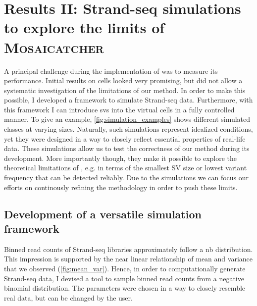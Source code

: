 \FloatBarrier
\section{Results II: Strand-seq simulations to explore the limits of \textsc{Mosaicatcher}}
\label{sec:mosaic_simul}

A principal challenge during the implementation of \mc was to measure its
performance. Initial results on  cells looked very promising, but did not
allow a systematic investigation of the limitations of our method. In order to
make this possible, I developed a framework to simulate Strand-seq data.
Furthermore, with this framework I can introduce \acp{sv}  into the virtual cells in a fully
controlled manner. To give an example, \cref{fig:simulation_examples} shows
different simulated \sv classes at varying sizes. Naturally, such simulations
represent idealized conditions, yet they were designed in a way to closely
reflect essential properties of real-life data.
These simulations allow us to test the correctness of our method during its
development. More importantly though, they make it possible to explore the
theoretical limitations of \mc, e.g. in terms of the smallest SV size or lowest
variant frequency that can be detected reliably. Due to the
simulations we can focus our efforts on continously refining the methodology in
order to push these limits.





\subsection{Development of a versatile simulation framework}
\label{sec:mosaic_simul_framework}

Binned read counts of Strand-seq libraries approximately follow a \acl{nb}
distribution. This impression is supported by the near linear relationship of
mean and variance that we observed (\cref{fig:mean_var}). Hence, in order to
computationally generate Strand-seq data, I devised a tool to sample binned read
counts from a negative binomial distribution. The \nb parameters were chosen
in a way to closely resemble real data, but can be changed by the user.

